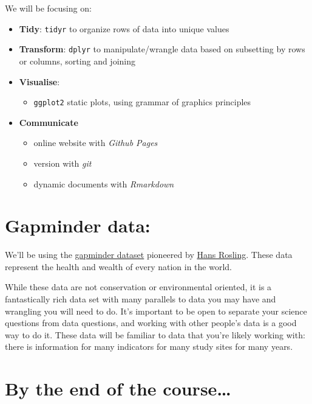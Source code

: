 \documentclass[]{book}
\providecommand{\tightlist}{%
  \setlength{\itemsep}{0pt}\setlength{\parskip}{0pt}}
\theoremstyle{definition}
\theoremstyle{definition}
\theoremstyle{definition}
\theoremstyle{remark}
\begin{document}
We will be focusing on:

\begin{itemize}
\tightlist
\item
  \textbf{Tidy}: \texttt{tidyr} to organize rows of data into unique
  values
\item
  \textbf{Transform}: \texttt{dplyr} to manipulate/wrangle data based on
  subsetting by rows or columns, sorting and joining
\item
  \textbf{Visualise}:

  \begin{itemize}
  \tightlist
  \item
    \texttt{ggplot2} static plots, using grammar of graphics principles
  \end{itemize}
\item
  \textbf{Communicate}

  \begin{itemize}
  \tightlist
  \item
    online website with \emph{Github Pages}
  \item
    version with \emph{git}
  \item
    dynamic documents with \emph{Rmarkdown}
  \end{itemize}
\end{itemize}

\section{Gapminder data:}\label{gapminder-data}

We'll be using the \href{http://www.gapminder.org/world}{gapminder
dataset} pioneered by
\href{https://www.ted.com/speakers/hans_rosling}{Hans Rosling}. These
data represent the health and wealth of every nation in the world.

While these data are not conservation or environmental oriented, it is a
fantastically rich data set with many parallels to data you may have and
wrangling you will need to do. It's important to be open to separate
your science questions from data questions, and working with other
people's data is a good way to do it. These data will be familiar to
data that you're likely working with: there is information for many
indicators for many study sites for many years.

\section{By the end of the
course\ldots{}}\label{by-the-end-of-the-course}
\end{document}
